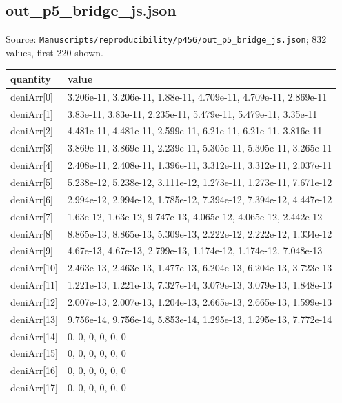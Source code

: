 \subsection*{out\_p5\_bridge\_js.json}
\noindent\small Source: \nolinkurl{Manuscripts/reproducibility/p456/out_p5_bridge_js.json}; 832 values, first 220 shown.\par
{\scriptsize\begin{longtable}{p{}p{}}\toprule\textbf{quantity} & \textbf{value}\\\midrule\endhead
{}deniArr[0] & 3.206e-11, 3.206e-11, 1.88e-11, 4.709e-11, 4.709e-11, 2.869e-11\\
{}deniArr[1] & 3.83e-11, 3.83e-11, 2.235e-11, 5.479e-11, 5.479e-11, 3.35e-11\\
{}deniArr[2] & 4.481e-11, 4.481e-11, 2.599e-11, 6.21e-11, 6.21e-11, 3.816e-11\\
{}deniArr[3] & 3.869e-11, 3.869e-11, 2.239e-11, 5.305e-11, 5.305e-11, 3.265e-11\\
{}deniArr[4] & 2.408e-11, 2.408e-11, 1.396e-11, 3.312e-11, 3.312e-11, 2.037e-11\\
{}deniArr[5] & 5.238e-12, 5.238e-12, 3.111e-12, 1.273e-11, 1.273e-11, 7.671e-12\\
{}deniArr[6] & 2.994e-12, 2.994e-12, 1.785e-12, 7.394e-12, 7.394e-12, 4.447e-12\\
{}deniArr[7] & 1.63e-12, 1.63e-12, 9.747e-13, 4.065e-12, 4.065e-12, 2.442e-12\\
{}deniArr[8] & 8.865e-13, 8.865e-13, 5.309e-13, 2.222e-12, 2.222e-12, 1.334e-12\\
{}deniArr[9] & 4.67e-13, 4.67e-13, 2.799e-13, 1.174e-12, 1.174e-12, 7.048e-13\\
{}deniArr[10] & 2.463e-13, 2.463e-13, 1.477e-13, 6.204e-13, 6.204e-13, 3.723e-13\\
{}deniArr[11] & 1.221e-13, 1.221e-13, 7.327e-14, 3.079e-13, 3.079e-13, 1.848e-13\\
{}deniArr[12] & 2.007e-13, 2.007e-13, 1.204e-13, 2.665e-13, 2.665e-13, 1.599e-13\\
{}deniArr[13] & 9.756e-14, 9.756e-14, 5.853e-14, 1.295e-13, 1.295e-13, 7.772e-14\\
{}deniArr[14] & 0, 0, 0, 0, 0, 0\\
{}deniArr[15] & 0, 0, 0, 0, 0, 0\\
{}deniArr[16] & 0, 0, 0, 0, 0, 0\\
{}deniArr[17] & 0, 0, 0, 0, 0, 0\\

\end{longtable}}
